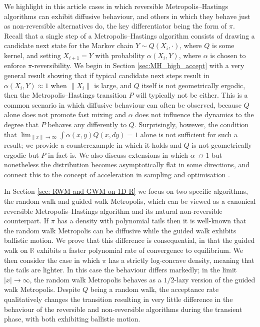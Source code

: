\documentclass{article}
\theoremstyle{definition}
\theoremstyle{plain}
\begin{document}
We highlight in this article cases in which reversible Metropolis--Hastings algorithms can exhibit diffusive behaviour, and others in which they behave just as non-reversible alternatives do, the key differentiator being the form of $\pi$.  Recall that a single step of a Metropolis--Hastings algorithm consists of drawing a candidate next state for the Markov chain $Y \sim Q(X_i,\cdot)$, where $Q$ is some kernel, and setting $X_{i+1} = Y$ with probability $\alpha(X_i,Y)$, where $\alpha$ is chosen to enforce $\pi$-reversibility.  We begin in Section \ref{sec:MH_high_accept} with a very general result showing that if typical candidate next steps result in $\alpha(X_i,Y) \approx 1$ when $\|X_i\|$ is large, and $Q$ itself is not geometrically ergodic, then the Metropolis--Hastings transition $P$ will typically not be either.  This is a common scenario in which diffusive behaviour can often be observed, because $Q$ alone does not promote fast mixing and $\alpha$ does not influence the dynamics to the degree that $P$ behaves any differently to $Q$.  Surprisingly, however, the condition that $\lim_{\|x\|\to\infty}\int \alpha(x,y)Q(x,dy) = 1$ alone is not sufficient for such a result; we provide a counterexample in which it holds and $Q$ is not geometrically ergodic but $P$ in fact is.  We also discuss extensions in which $\alpha \not\to 1$ but nonetheless the distribution becomes asymptotically flat in some directions, and connect this to the concept of acceleration in sampling and optimisation \cite{oberdorster2025accelerated, bubeck2015convex}.  

In Section \ref{sec: RWM and GWM on 1D R} we focus on two specific algorithms, the random walk and guided walk Metropolis, which can be viewed as a canonical reversible Metropolis--Hastings algorithm and its natural non-reversible counterpart.  If $\pi$ has a density with polynomial tails then it is well-known that the random walk Metropolis can be diffusive while the guided walk exhibits ballistic motion.  We prove that this difference is consequential, in that the guided walk on $\mathbb{R}$ exhibits a faster polynomial rate of convergence to equilibrium.  We then consider the case in which $\pi$ has a strictly log-concave density, meaning that the tails are lighter. In this case the behaviour differs markedly; in the limit $|x|\to\infty$, the random walk Metropolis behaves as a $1/2$-lazy version of the guided walk Metropolis.  Despite $Q$ being a random walk, the acceptance rate qualitatively changes the transition resulting in very little difference in the behaviour of the reversible and non-reversible algorithms during the transient phase, with both exhibiting ballistic motion.
\end{document}
